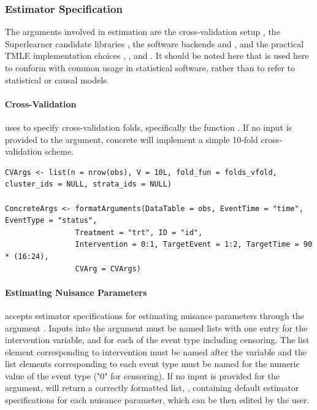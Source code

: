 \documentclass{report}
\newcommand{\1}{\ensuremath{\mathbf{1}}}
\begin{document}
\subsubsection{Estimator Specification}
\label{EstimationSpec}
The  arguments involved in estimation are the cross-validation setup , the Superlearner candidate libraries , the software backends  and , and the practical TMLE implementation choices , , and . It should be noted here that  is used here to conform with common usage in statistical software, rather than to refer to statistical or causal models. 

\paragraph{Cross-Validation}
\label{CV}
 uses  to specify cross-validation folds, specifically the function
. If no input is provided to the  argument, concrete will implement a simple 10-fold cross-validation scheme.

\begin{lstlisting}
CVArgs <- list(n = nrow(obs), V = 10L, fold_fun = folds_vfold, cluster_ids = NULL, strata_ids = NULL)

ConcreteArgs <- formatArguments(DataTable = obs, EventTime = "time", EventType = "status", 
				Treatment = "trt", ID = "id", 
				Intervention = 0:1, TargetEvent = 1:2, TargetTime = 90 * (16:24), 
				CVArg = CVArgs)
\end{lstlisting}

\paragraph{Estimating Nuisance Parameters}
\label{NuisanceEstimation}
 accepts estimator specifications for estimating nuisance parameters through the argument . Inputs into the  argument must be named lists with one entry for the intervention variable, and for each of the event type including censoring. The list element corresponding to intervention must be named after the variable and the list elements corresponding to each event type must be named for the numeric value of the event type ("0" for censoring). If no input is provided for the  argument,  will return a correctly formatted list, , containing default estimator specifications for each nuisance parameter, which can be then edited by the user.
\end{document}
